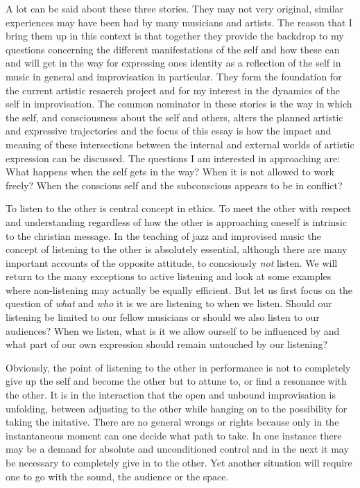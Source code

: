 \documentclass[a4paper]{article}
\begin{document}
A lot can be said about these three stories. They may not very original, similar experiences may have been had by many musicians and artists. The reason that I bring them up in this context is that together they provide the backdrop to my questions concerning the different manifestations of the self and how these can and will get in the way for expressing ones identity as a reflection of the self in music in general and improvisation in particular. They form the foundation for the current artistic resaerch project and for my interest in the dynamics of the self in improvisation. The common nominator in these stories is the way in which the self, and consciousness about the self and others, alters the planned artistic and expressive trajectories and the focus of this essay is how the impact and meaning of these intersections between the internal and external worlds of artistic expression can be discussed. The questions I am interested in approaching are: What happens when the self gets in the way? When it is not allowed to work freely? When the conscious self and the subconscious appears to be in conflict?


To listen to the other is central concept in ethics. To meet the other with respect and understanding regardless of how the other is approaching oneself is intrinsic to the christian message. In the teaching of jazz and improvised music the concept of listening to the other is absolutely essential, although there are many important accounts of the opposite attitude, to concsiously \emph{not} listen. 
We will return to the many exceptions to active listening and look at some examples where non-listening may actually be equally efficient. But let us first focus on the question of \emph{what} and \emph{who} it is we are listening to when we listen. Should our listening be limited to our fellow musicians or should we also listen to our audiences? When we listen, what is it we allow ourself to be influenced by and what part of our own expression should remain untouched by our listening?

Obviously, the point of listening to the other in performance is not to completely give up the self and become the other but to attune to, or find a resonance with the other. It is in the interaction that the open and unbound improvisation is unfolding, between adjusting to the other while hanging on to the possibility for taking the initative. There are no general wrongs or rights because only in the instantaneous moment can one decide what path to take. In one instance there may be a demand for absolute and unconditioned control and in the next it may be necessary to completely give in to the other. Yet another situation will require one to go with the sound, the audience or the space.
\end{document}
